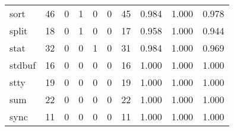 \begin{longtable}{lp{1.3cm}p{1.3cm}p{1.3cm}p{1.3cm}p{1.3cm}p{1.3cm}p{1.3cm}p{1.3cm}p{1.3cm}}
sort      &                     46 &                                             0 &                                            1 &                                           0 &                                            0 &                                         45 &                                0.984 &                                  1.000 &                                0.978 \\
split     &                     18 &                                             0 &                                            1 &                                           0 &                                            0 &                                         17 &                                0.958 &                                  1.000 &                                0.944 \\
stat      &                     32 &                                             0 &                                            0 &                                           1 &                                            0 &                                         31 &                                0.984 &                                  1.000 &                                0.969 \\
stdbuf    &                     16 &                                             0 &                                            0 &                                           0 &                                            0 &                                         16 &                                1.000 &                                  1.000 &                                1.000 \\
stty      &                     19 &                                             0 &                                            0 &                                           0 &                                            0 &                                         19 &                                1.000 &                                  1.000 &                                1.000 \\
sum       &                     22 &                                             0 &                                            0 &                                           0 &                                            0 &                                         22 &                                1.000 &                                  1.000 &                                1.000 \\
sync      &                     11 &                                             0 &                                            0 &                                           0 &                                            0 &                                         11 &                                1.000 &                                  1.000 &                                1.000 \\

\end{longtable}
